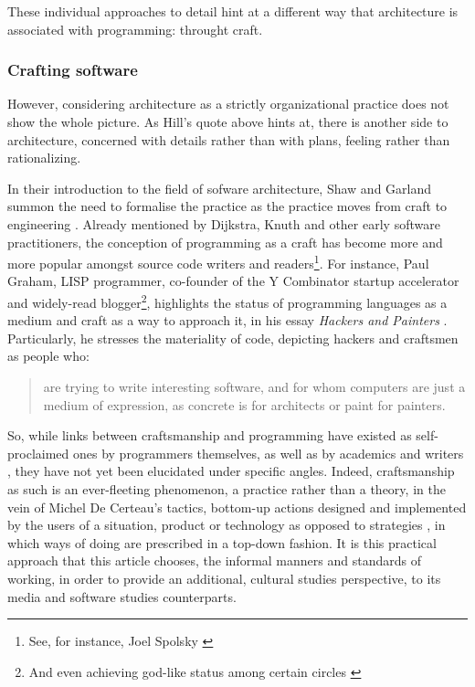 These individual approaches to detail hint at a different way that architecture is associated with programming: throught craft.

\subsubsection{Crafting software}
\label{subsubsec:crafting-software}

However, considering architecture as a strictly organizational practice does not show the whole picture. As Hill's quote above hints at, there is another side to architecture, concerned with details rather than with plans, feeling rather than rationalizing.

In their introduction to the field of sofware architecture, Shaw and Garland summon the need to formalise the practice as the practice moves from craft to engineering \citep{shaw_software_1996}. Already mentioned by Dijkstra, Knuth and other early software practitioners, the conception of programming as a craft has become more and more popular amongst source code writers and readers\footnote{See, for instance, Joel Spolsky \citep{spolosky_craftsmanship_2003,seibel_coders_2009}}.  For instance, Paul Graham, LISP programmer, co-founder of the Y Combinator startup accelerator and widely-read blogger\footnote{And even achieving god-like status among certain circles \citep{eadicicco_startup_2014}}, highlights the status of programming languages as a medium and craft as a way to approach it, in his essay \emph{Hackers and Painters} \citep{graham_hackers_2003}. Particularly, he stresses the materiality of code, depicting hackers and craftsmen as people who:

\begin{quote}
  are trying to write interesting software, and for whom computers are just a medium of expression, as concrete is for architects or paint for painters.
\end{quote}

So, while links between craftsmanship and programming have existed as self-proclaimed ones by programmers themselves, as well as by academics and writers  \citep{sennett_craftsman_2009,chandra_geek_2014}, they have not yet been elucidated under specific angles. Indeed, craftsmanship as such is an ever-fleeting phenomenon, a practice rather than a theory, in the vein of Michel De Certeau's tactics, bottom-up actions designed and implemented by the users of a situation, product or technology as opposed to strategies \citep{certeau_invention_1990}, in which ways of doing are prescribed in a top-down fashion. It is this practical approach that this article chooses, the informal manners and standards of working, in order to provide an additional, cultural studies perspective, to its media and software studies counterparts.

